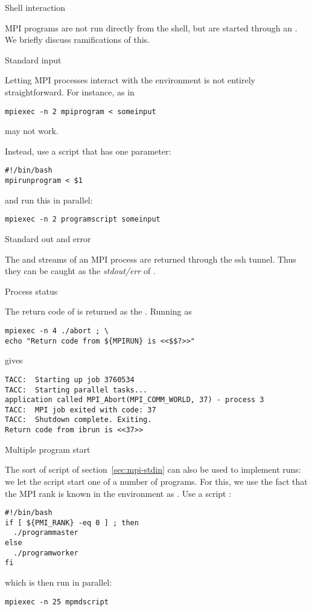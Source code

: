  {Shell interaction}

MPI programs are not run directly from the shell, but are started
through an . We briefly discuss
ramifications of this.

 {Standard input}
\label{sec:mpi-stdin}

Letting MPI processes interact with the environment is not entirely
straightforward.
For instance,
%
as in
\begin{verbatim}
mpiexec -n 2 mpiprogram < someinput
\end{verbatim}
may not work.

Instead, use a script  that has one parameter:
\begin{verbatim}
#!/bin/bash
mpirunprogram < $1
\end{verbatim}
and run this in parallel:
\begin{verbatim}
mpiexec -n 2 programscript someinput
\end{verbatim}

 {Standard out and error}

The  and  streams of an MPI
process are returned through the ssh tunnel. Thus they can be caught
as the \emph{stdout/err} of
.


 {Process status}

The return code of  is returned as the
.
Running
as
\begin{verbatim}
mpiexec -n 4 ./abort ; \
echo "Return code from ${MPIRUN} is <<$$?>>"
\end{verbatim}
gives
\begin{verbatim}
TACC:  Starting up job 3760534
TACC:  Starting parallel tasks...
application called MPI_Abort(MPI_COMM_WORLD, 37) - process 3
TACC:  MPI job exited with code: 37
TACC:  Shutdown complete. Exiting.
Return code from ibrun is <<37>>
\end{verbatim}

 {Multiple program start}
\label{sec:mpmd-start}

The sort of script of section~\ref{sec:mpi-stdin}
can also be used to implement  runs:
we let the script start one of a number of programs. For this, we use
the fact that the MPI rank is known in the environment as
. Use a script :
\begin{verbatim}
#!/bin/bash
if [ ${PMI_RANK} -eq 0 ] ; then
  ./programmaster
else
  ./programworker
fi
\end{verbatim}
which is then run in parallel:
\begin{verbatim}
mpiexec -n 25 mpmdscript
\end{verbatim}


